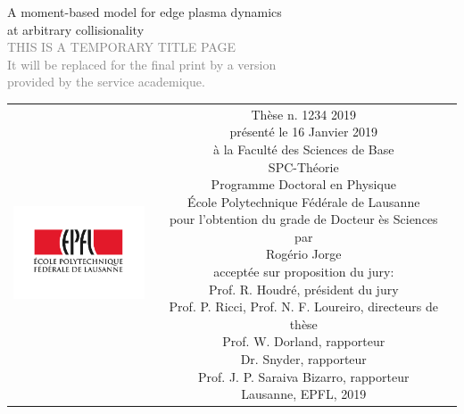 \begin{titlepage}

 \begin{center}
 \sffamily
 \null\vspace{2cm}
 {\huge A moment-based model for edge plasma dynamics\\[12pt] at arbitrary collisionality} \\[24pt] 
 \textcolor{gray}{\small{THIS IS A TEMPORARY TITLE PAGE \\ It will be replaced for the final print by a version \\ provided by the service academique.}}
 \vfill
 \begin{tabular} {cc}
 \parbox{0.3\textwidth}{\includegraphics[width=4cm]{images/epfl}}
 &
 \parbox{0.7\textwidth}{%
 	Thèse n. 1234 2019\\
 	présenté le 16 Janvier 2019\\
 	à la Faculté des Sciences de Base\\
 	SPC-Théorie\\
 	Programme Doctoral en Physique\\
 	École Polytechnique Fédérale de Lausanne\\[6pt]
 	pour l'obtention du grade de Docteur ès Sciences\\
 	par\\ [4pt]
 	\null \hspace{3em} Rogério Jorge\\[12pt]
 \small
 acceptée sur proposition du jury:\\[4pt]
     Prof. R. Houdré, président du jury\\
     Prof. P. Ricci, Prof. N. F. Loureiro, directeurs de thèse\\
     Prof. W. Dorland, rapporteur\\
     Dr. Snyder, rapporteur\\
     Prof. J. P. Saraiva Bizarro, rapporteur\\[12pt]
 Lausanne, EPFL, 2019}
 \end{tabular}
 \end{center}
 \vspace{2cm}

\end{titlepage}




